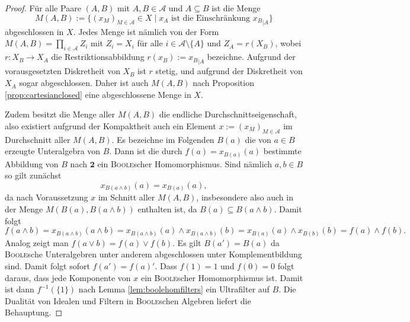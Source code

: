 \begin{proof}
  Für alle Paare $(A,B)$ mit $A,B \in \mathcal{A}$ und $A \subseteq B$ ist die Menge
  \begin{displaymath}
    M(A,B) := \{ (x_M)_{M \in \mathcal{A}} \in X \mid x_A \text{ ist die Einschränkung } {x_B}_{|A} \}
  \end{displaymath}
  abgeschlossen in $X$. 
  Jedes Menge ist nämlich von der Form $M(A,B) = \prod_{i \in \mathcal{A}} Z_i$ mit $Z_i = X_i$ für alle $i \in \mathcal{A} \setminus \{A\}$ und $Z_A = r(X_B)$, wobei $r \colon X_B \to X_A$ die Restriktionsabbildung $r(x_B) := {x_B}_{|A}$ bezeichne.
  Aufgrund der vorausgesetzten Diskretheit von $X_B$ ist $r$ stetig, und aufgrund der Diskretheit von $X_A$ sogar abgeschlossen.
  Daher ist auch $M(A,B)$ nach Proposition \ref{prop:cartesianclosed} eine abgeschlossene Menge in $X$.

  Zudem besitzt die Menge aller $M(A,B)$ die endliche Durchschnittseigenschaft, also existiert aufgrund der Kompaktheit auch ein Element $x := (x_M)_{M \in \mathcal{A}}$ im Durchschnitt aller $M(A,B)$.
  Es bezeichne im Folgenden $B(a)$ die von $a \in B$ erzeugte Unteralgebra von $B$.
  Dann ist die durch $f(a) = x_{B(a)}(a)$ bestimmte Abbildung von $B$ nach $\mathbf{2}$ ein \textsc{Boole}scher Homomorphismus.
  Sind nämlich $a,b \in B$ so gilt zunächst 
  \begin{displaymath}
    x_{B(a \land b)}(a) = x_{B(a)}(a),
  \end{displaymath}
  da nach Voraussetzung $x$ im Schnitt aller $M(A,B)$, insbesondere also auch in der Menge $M(B(a),B(a \land b))$ enthalten ist, da $B(a) \subseteq B(a \land b)$.
  Damit folgt
  \begin{displaymath}
    f(a \land b) 
    = x_{B(a \land b)}(a \land b)
    = x_{B(a \land b)}(a) \land x_{B(a \land b)}(b)
    = x_{B(a)}(a) \land x_{B(b)}(b)
    = f(a) \land f(b).
  \end{displaymath}
  Analog zeigt man $f(a \lor b) = f(a) \lor f(b)$.
  Es gilt $B(a') = B(a)$ da \textsc{Boole}sche Unteralgebren unter anderem abgeschlossen unter Komplementbildung sind.
  Damit folgt sofort $f(a') = f(a)'$.
  Dass $f(1) = 1$ und $f(0) = 0$ folgt daraus, dass jede Komponente von $x$ ein \textsc{Boole}scher Homomorphismus ist.
  Damit ist dann $f^{-1}(\{1\})$ nach Lemma \ref{lem:boolehomfilters} ein Ultrafilter auf $B$.
  Die Dualität von Idealen und Filtern in \textsc{Boole}schen Algebren liefert die Behauptung.
\end{proof}


